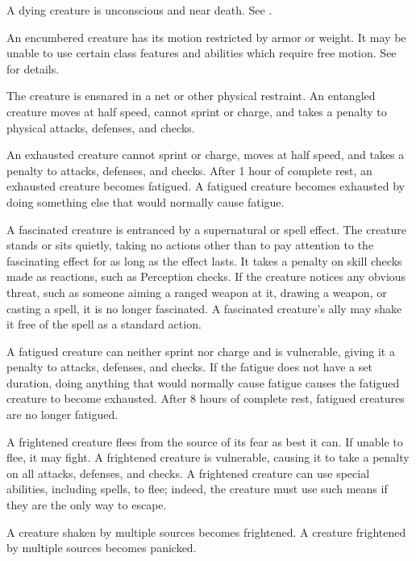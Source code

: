  A dying creature is unconscious and near death. See .

 An encumbered creature has its motion restricted by armor or weight. It may be unable to use certain class features and abilities which require free motion. See  for details.

 The creature is ensnared in a net or other physical restraint. An entangled creature moves at half speed, cannot sprint or charge, and takes a  penalty to physical attacks, defenses, and checks.

 An exhausted creature cannot sprint or charge, moves at half speed, and takes a  penalty to attacks, defenses, and checks. After 1 hour of complete rest, an exhausted creature becomes fatigued. A fatigued creature becomes exhausted by doing something else that would normally cause fatigue.

 A fascinated creature is entranced by a supernatural or spell effect. The creature stands or sits quietly, taking no actions other than to pay attention to the fascinating effect for as long as the effect lasts. It takes a  penalty on skill checks made as reactions, such as Perception checks. If the creature notices any obvious threat, such as someone aiming a ranged weapon at it, drawing a weapon, or casting a spell, it is no longer fascinated. A fascinated creature's ally may shake it free of the spell as a standard action.

 A fatigued creature can neither sprint nor charge and is vulnerable, giving it a  penalty to attacks, defenses, and checks. If the fatigue does not have a set duration, doing anything that would normally cause fatigue causes the fatigued creature to become exhausted. After 8 hours of complete rest, fatigued creatures are no longer fatigued.

 A frightened creature flees from the source of its fear as best it can. If unable to flee, it may fight. A frightened creature is vulnerable, causing it to take a  penalty on all attacks, defenses, and checks. A frightened creature can use special abilities, including spells, to flee; indeed, the creature must use such means if they are the only way to escape.

A creature shaken by multiple sources becomes frightened. A creature frightened by multiple sources becomes panicked.

